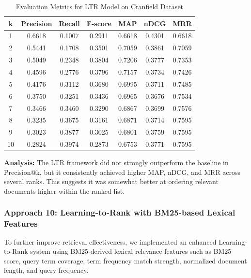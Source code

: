 \begin{table}[H]
\centering
\begin{tabular}{|c|c|c|c|c|c|c|}
\hline
k & Precision & Recall & F-score & MAP & nDCG & MRR \\
\hline
1 & 0.6618 & 0.1007 & 0.2911 & 0.6618 & 0.4301 & 0.6618 \\
2 & 0.5441 & 0.1708 & 0.3501 & 0.7059 & 0.3861 & 0.7059 \\
3 & 0.5049 & 0.2348 & 0.3804 & 0.7206 & 0.3777 & 0.7353 \\
4 & 0.4596 & 0.2776 & 0.3796 & 0.7157 & 0.3734 & 0.7426 \\
5 & 0.4176 & 0.3112 & 0.3680 & 0.6995 & 0.3711 & 0.7485 \\
6 & 0.3750 & 0.3251 & 0.3436 & 0.6965 & 0.3676 & 0.7534 \\
7 & 0.3466 & 0.3460 & 0.3290 & 0.6867 & 0.3699 & 0.7576 \\
8 & 0.3235 & 0.3675 & 0.3161 & 0.6871 & 0.3714 & 0.7595 \\
9 & 0.3023 & 0.3877 & 0.3025 & 0.6801 & 0.3759 & 0.7595 \\
10 & 0.2824 & 0.3974 & 0.2873 & 0.6753 & 0.3771 & 0.7595 \\
\hline
\end{tabular}
\caption{Evaluation Metrics for LTR Model on Cranfield Dataset}
\end{table}

\textbf{Analysis:}
The LTR framework did not strongly outperform the baseline in Precision@k, but it consistently achieved higher MAP, nDCG, and MRR across several ranks. This suggests it was somewhat better at ordering relevant documents higher within the ranked list.

\subsubsection{Approach 10: Learning-to-Rank with BM25-based Lexical Features}
To further improve retrieval effectiveness, we implemented an enhanced Learning-to-Rank system using BM25-derived lexical relevance features such as BM25 score, query term coverage, term frequency match strength, normalized document length, and query frequency.

